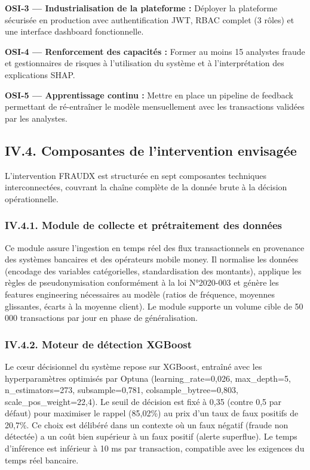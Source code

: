 \documentclass[
  12pt,
]{article}
\begin{document}
\textbf{OSI-3 — Industrialisation de la plateforme :} Déployer la
plateforme sécurisée en production avec authentification JWT, RBAC
complet (3 rôles) et une interface dashboard fonctionnelle.

\textbf{OSI-4 — Renforcement des capacités :} Former au moins 15
analystes fraude et gestionnaires de risques à l’utilisation du système
et à l’interprétation des explications SHAP.

\textbf{OSI-5 — Apprentissage continu :} Mettre en place un pipeline de
feedback permettant de ré-entraîner le modèle mensuellement avec les
transactions validées par les analystes.

\subsection{IV.4. Composantes de l’intervention
envisagée}\label{iv.4.-composantes-de-lintervention-envisaguxe9e}

L’intervention FRAUDX est structurée en sept composantes techniques
interconnectées, couvrant la chaîne complète de la donnée brute à la
décision opérationnelle.

\subsubsection{IV.4.1. Module de collecte et prétraitement des
données}\label{iv.4.1.-module-de-collecte-et-pruxe9traitement-des-donnuxe9es}

Ce module assure l’ingestion en temps réel des flux transactionnels en
provenance des systèmes bancaires et des opérateurs mobile money. Il
normalise les données (encodage des variables catégorielles,
standardisation des montants), applique les règles de pseudonymisation
conformément à la loi N°2020-003 et génère les features engineering
nécessaires au modèle (ratios de fréquence, moyennes glissantes, écarts
à la moyenne client). Le module supporte un volume cible de 50 000
transactions par jour en phase de généralisation.

\subsubsection{IV.4.2. Moteur de détection
XGBoost}\label{iv.4.2.-moteur-de-duxe9tection-xgboost}

Le cœur décisionnel du système repose sur XGBoost, entraîné avec les
hyperparamètres optimisés par Optuna (learning\_rate=0,026,
max\_depth=5, n\_estimators=273, subsample=0,781,
colsample\_bytree=0,803, scale\_pos\_weight=22,4). Le seuil de décision
est fixé à 0,35 (contre 0,5 par défaut) pour maximiser le rappel
(85,02\%) au prix d’un taux de faux positifs de 20,7\%. Ce choix est
délibéré dans un contexte où un faux négatif (fraude non détectée) a un
coût bien supérieur à un faux positif (alerte superflue). Le temps
d’inférence est inférieur à 10 ms par transaction, compatible avec les
exigences du temps réel bancaire.
\end{document}
